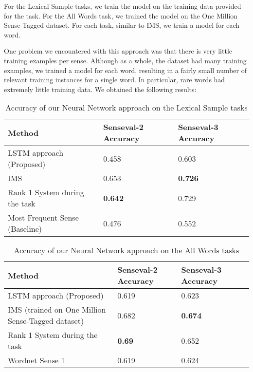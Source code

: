 \documentclass[11pt]{article}
\begin{document}
For the Lexical Sample tasks, we train the model on the training data provided for the task. For the All Words task, we trained the model on the One Million Sense-Tagged dataset. For each task, similar to IMS, we train a model for each word. 

One problem we encountered with this approach was that there is very little training examples per sense. Although as a whole, the dataset had many training examples, we trained a model for each word, resulting in a fairly small number of relevant training instances for a single word. In particular, rare words had extremely little training data. We obtained the following results:






\begin{table}
	\caption{Accuracy of our Neural Network approach on the Lexical Sample tasks}
	\label{table:NN-LS}
	\begin{center}
		\begin{tabular}{| p{6cm} | p{4cm} | p{4cm} |}
			\hline
			Method & Senseval-2 Accuracy & Senseval-3 Accuracy \\
			\hline
			LSTM approach (Proposed) & 0.458  & 0.603 \\
			
			\hline
			IMS & 0.653 & {\bf0.726}\\
			\hline
			Rank 1 System during the task & {\bf0.642} & 0.729 \\
			\hline
			Most Frequent Sense (Baseline) & 0.476 & 0.552 \\
			\hline
		\end{tabular}
	\end{center}
\end{table}

\begin{table}
	\caption{Accuracy of our Neural Network approach on the All Words tasks}
	\label{table:NN_AW}
	\begin{center}
		\begin{tabular}{| p{7cm} | p{2cm} | p{2cm} | p{2cm} | }
			\hline
			Method & Senseval-2 Accuracy & Senseval-3 Accuracy\\
			\hline
			LSTM approach (Proposed) & 0.619  & 0.623  \\
			
			\hline
			IMS (trained on One Million Sense-Tagged dataset) & 0.682 & {\bf0.674} \\
			\hline
			Rank 1 System during the task & {\bf0.69} & 0.652  \\
			\hline
			Wordnet Sense 1 & 0.619 & 0.624  \\
			\hline
		\end{tabular}
	\end{center}
\end{table}
\end{document}
